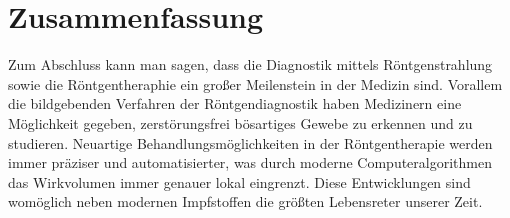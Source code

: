 \section{Zusammenfassung}
Zum Abschluss kann man sagen, dass die Diagnostik mittels Röntgenstrahlung sowie die Röntgentheraphie ein großer Meilenstein in der Medizin sind.
Vorallem die bildgebenden Verfahren der Röntgendiagnostik haben Medizinern eine Möglichkeit gegeben, zerstörungsfrei bösartiges Gewebe zu erkennen und zu studieren.
Neuartige Behandlungsmöglichkeiten in der Röntgentherapie werden immer präziser und automatisierter, was durch moderne Computeralgorithmen das Wirkvolumen immer genauer lokal eingrenzt.
Diese Entwicklungen sind womöglich neben modernen Impfstoffen die größten Lebensreter unserer Zeit. 